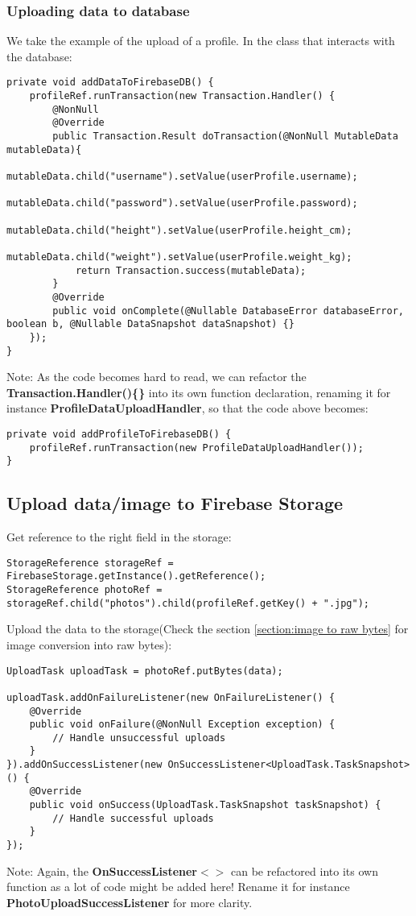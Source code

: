 \documentclass[11pt]{article}
\begin{document}
\subsubsection{Uploading data to database}
We take the example of the upload of a profile. In the class that interacts with the database:
\lstset{language = Java}
\begin{lstlisting}
private void addDataToFirebaseDB() {
	profileRef.runTransaction(new Transaction.Handler() {
		@NonNull		
		@Override
		public Transaction.Result doTransaction(@NonNull MutableData mutableData){
			mutableData.child("username").setValue(userProfile.username);
			mutableData.child("password").setValue(userProfile.password);
			mutableData.child("height").setValue(userProfile.height_cm);
			mutableData.child("weight").setValue(userProfile.weight_kg);
			return Transaction.success(mutableData);
		}
		@Override
		public void onComplete(@Nullable DatabaseError databaseError, boolean b, @Nullable DataSnapshot dataSnapshot) {} 
	});
}
\end{lstlisting}
Note: As the code becomes hard to read, we can refactor the \textbf{Transaction.Handler()\{\}} into its own function declaration, renaming it for instance \textbf{ProfileDataUploadHandler}, so that the code above becomes:
\lstset{language = Java}
\begin{lstlisting}
private void addProfileToFirebaseDB() {
	profileRef.runTransaction(new ProfileDataUploadHandler());
}
\end{lstlisting}

\subsection{Upload data/image to Firebase Storage}
Get reference to the right field in the storage:
\lstset{language = Java}
\begin{lstlisting}
StorageReference storageRef = FirebaseStorage.getInstance().getReference();
StorageReference photoRef = storageRef.child("photos").child(profileRef.getKey() + ".jpg");
\end{lstlisting}

Upload the data to the storage(Check the section \ref{section:image to raw bytes} for image conversion into raw bytes):
\lstset{language = Java}
\begin{lstlisting}
UploadTask uploadTask = photoRef.putBytes(data);

uploadTask.addOnFailureListener(new OnFailureListener() {
	@Override
	public void onFailure(@NonNull Exception exception) {
		// Handle unsuccessful uploads
	}
}).addOnSuccessListener(new OnSuccessListener<UploadTask.TaskSnapshot>() {
	@Override
	public void onSuccess(UploadTask.TaskSnapshot taskSnapshot) {
		// Handle successful uploads
	}
});
\end{lstlisting}
Note: Again, the \textbf{OnSuccessListener$<>$} can be refactored into its own function as a lot of code might be added here! Rename it for instance \textbf{PhotoUploadSuccessListener} for more clarity. 
\end{document}
